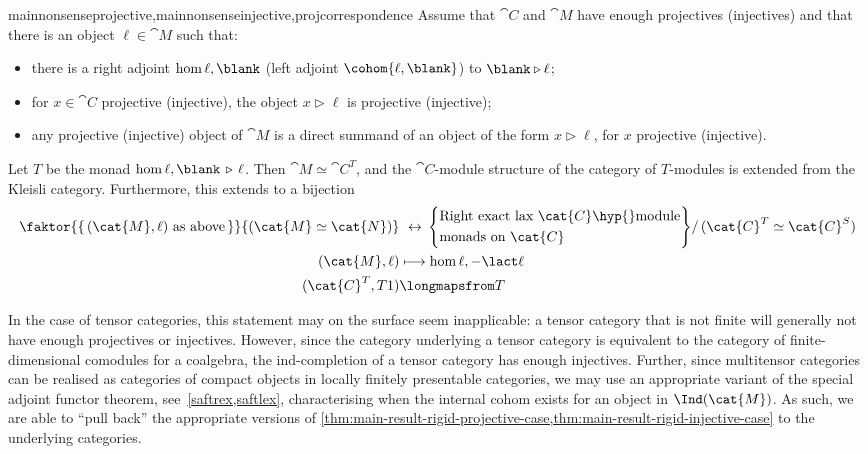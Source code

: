 \begin{reptheorem}{mainnonsenseprojective,mainnonsenseinjective,projcorrespondence}
  Assume that \(\cat{C}\) and \(\cat{M}\) have enough projectives (injectives) and that there is an object \(\ell \in \cat{M}\) such that:
  \begin{itemize}[noitemsep]
    \item there is a right adjoint \(\hom{\ell,\blank}\) (left adjoint \(\cohom{\ell,\blank}\)) to \(\blank \triangleright \ell\);
    \item for \(x \in \cat{C}\) projective (injective), the object \(x \triangleright \ell\) is projective (injective);
    \item any projective (injective) object of \(\cat{M}\) is a direct summand of an object of the form \(x \triangleright \ell\), for \(x\) projective (injective).
  \end{itemize}
  Let \(T\) be the monad \(\hom{\ell, \blank\,\triangleright\,\ell}\).
  Then \(\cat{M} \simeq \cat{C}^T\), and the \(\cat{C}\)\hyp{}module structure of the category of \(T\)\hyp{}modules is extended from the Kleisli category. Furthermore, this extends to a bijection
  \begin{align*}
    \faktor{\{\,(\cat{M},\ell) \text{ as above}\,\}}{(\cat{M} \simeq \cat{N})}
    &\ \leftrightarrow\,
      \Bigg\{
      \begin{aligned}
        &\text{Right exact lax \(\cat{C}\)\hyp{}module}\\
        &\text{monads on \(\cat{C}\)}
      \end{aligned}
      \Bigg\}
      /\, (\cat{C}^T \simeq \cat{C}^S) \\
    (\cat{M},\ell) &\longmapsto \hom{\ell,-\lact \ell} \\
    (\cat{C}^T, T1) &\longmapsfrom T
  \end{align*}
\end{reptheorem}

In the case of tensor categories,
this statement may on the surface seem inapplicable:
a tensor category that is not finite will generally not have enough projectives or injectives.
However, since the category underlying a tensor category is equivalent to the category of finite-dimensional comodules for a coalgebra,
the ind-completion of a tensor category has enough injectives.
Further, since multitensor categories can be realised as categories of compact objects in locally finitely presentable categories,
we may use an appropriate variant of the special adjoint functor theorem, see~\cref{saftrex,saftlex},
characterising when the internal cohom exists for an object in \(\Ind(\cat{M})\).
As such, we are able to ``pull back'' the appropriate versions of
\cref{thm:main-result-rigid-projective-case,thm:main-result-rigid-injective-case}
to the underlying categories.

